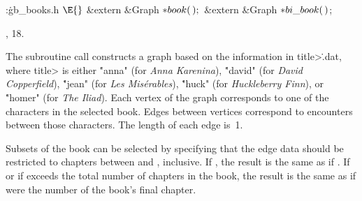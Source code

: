 \Y\B\4:\.{gb\_books.h }\X${}\E{}$\6
\&{extern} \&{Graph} ${}{*}\\{book}(\,);{}$\6
\&{extern} \&{Graph} ${}{*}\\{bi\_book}(\,){}$;\par
{}, 18.\fi

The subroutine call 
constructs a graph based on the information in \<title>\.{.dat},
where \<title> is either \.{"anna"} (for {\sl Anna Karenina\/}),
\.{"david"} (for {\sl David Copperfield\/}),
\.{"jean"} (for {\sl Les Mis\'erables\/}),
\.{"huck"} (for {\sl Huckleberry Finn\/}), or
\.{"homer"} (for {\sl The Iliad\/}).
Each vertex of the graph corresponds to one of the characters in the
selected book. Edges between vertices correspond to encounters between
those characters. The length of each edge is~1.

Subsets of the book can be selected by specifying that the edge data should be
restricted to chapters between  and ,
inclusive. If , the result is the same as if
. If  or if  exceeds
the total number of chapters in the book, the result is the same as
if  were the number of the book's final chapter.

